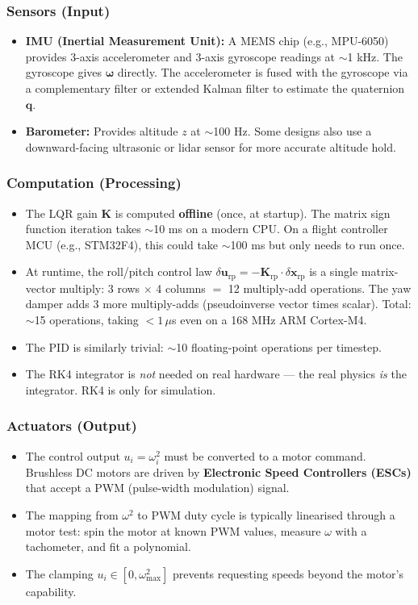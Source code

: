 \documentclass[12pt, a4paper]{article}
\newcommand{\bx}{\bm{x}}
\newcommand{\bu}{\bm{u}}
\newcommand{\bq}{\bm{q}}
\newcommand{\bomega}{\bm{\omega}}
\newcommand{\bK}{\bm{K}}
\begin{document}
\subsubsection{Sensors (Input)}
\begin{itemize}
    \item \textbf{IMU (Inertial Measurement Unit):} A MEMS chip (e.g., MPU-6050) provides 3-axis accelerometer and 3-axis gyroscope readings at $\sim$1 kHz.  The gyroscope gives $\bomega$ directly.  The accelerometer is fused with the gyroscope via a complementary filter or extended Kalman filter to estimate the quaternion $\bq$.
    \item \textbf{Barometer:} Provides altitude $z$ at $\sim$100 Hz.  Some designs also use a downward-facing ultrasonic or lidar sensor for more accurate altitude hold.
\end{itemize}

\subsubsection{Computation (Processing)}
\begin{itemize}
    \item The LQR gain $\bK$ is computed \textbf{offline} (once, at startup).  The matrix sign function iteration takes $\sim$10 ms on a modern CPU.  On a flight controller MCU (e.g., STM32F4), this could take $\sim$100 ms but only needs to run once.
    \item At runtime, the roll/pitch control law $\delta\bu_{\text{rp}} = -\bK_{\text{rp}} \cdot \delta\bx_{\text{rp}}$ is a single matrix-vector multiply: 3 rows $\times$ 4 columns $=$ 12 multiply-add operations.  The yaw damper adds 3 more multiply-adds (pseudoinverse vector times scalar).  Total: $\sim$15 operations, taking $< 1\,\mu$s even on a 168 MHz ARM Cortex-M4.
    \item The PID is similarly trivial: $\sim$10 floating-point operations per timestep.
    \item The RK4 integrator is \emph{not} needed on real hardware --- the real physics \emph{is} the integrator.  RK4 is only for simulation.
\end{itemize}

\subsubsection{Actuators (Output)}
\begin{itemize}
    \item The control output $u_i = \omega_i^2$ must be converted to a motor command.  Brushless DC motors are driven by \textbf{Electronic Speed Controllers (ESCs)} that accept a PWM (pulse-width modulation) signal.
    \item The mapping from $\omega^2$ to PWM duty cycle is typically linearised through a motor test: spin the motor at known PWM values, measure $\omega$ with a tachometer, and fit a polynomial.
    \item The clamping $u_i \in [0, \omega_{\max}^2]$ prevents requesting speeds beyond the motor's capability.
\end{itemize}
\end{document}
